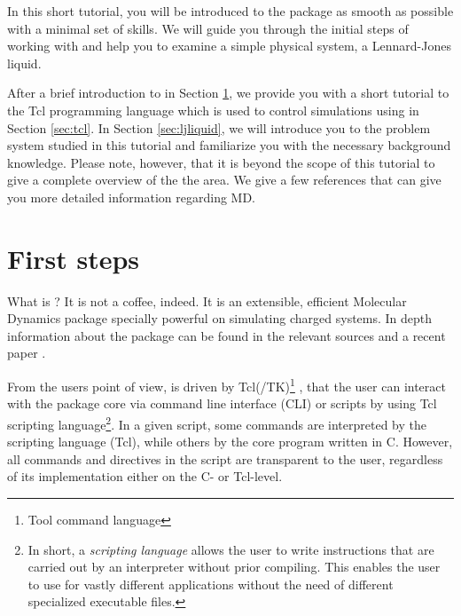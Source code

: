 \documentclass[
paper=a4,                       %
fontsize=11pt,                  %
twoside,                        %
footsepline,                    %
headsepline,                    %
headinclude=false,              %
footinclude=false,              %
pagesize,                       %
]{scrartcl}
\begin{document}
In this short tutorial, you will be introduced to the \es{} package as smooth 
as possible with a minimal set of skills. We will guide you through the initial 
steps of working with \es{} and help you to examine a simple physical system, a 
Lennard-Jones liquid.

After a brief introduction to \es{} in Section \ref{sec:espresso}, we provide 
you with a short tutorial to the Tcl programming language which is used to 
control simulations using \es{} in Section \ref{sec:tcl}. In Section \ref{sec:ljliquid}, we will 
introduce you to the problem system studied in this tutorial and familiarize you with the necessary 
background knowledge. Please note, however, that it is beyond the scope of this 
tutorial to give a complete overview of the the area. We give a few 
references that can give you more detailed information regarding MD.



\section{First steps}\label{sec:espresso}

  What is \es{}? It is not a coffee, indeed. It is an extensible, efficient 
  Molecular Dynamics package specially powerful on simulating charged systems. 
  In depth information about the package can be found in the relevant sources 
  \cite{esp_url,arnold2003ees} and a recent paper \cite{limbach2006ees}.

  From the users point of view, \es{} is driven by Tcl(/TK)\footnote{Tool
  command language} \cite{tcl_url}, that the
  user can interact with the package core via command line interface (CLI) or 
  scripts by using Tcl scripting language\footnote{In short, a \emph{scripting language
  } allows the user to write instructions that are carried out by an interpreter
  without prior compiling. This enables the user to use \es{} for vastly
  different applications without the need of different specialized executable files.}.
  In a given \es{} script, some commands
  are interpreted by the scripting language (Tcl), while others by the core
  \es{} program written in C. However, all \es{} commands and directives in the
  script are
  transparent to the user, regardless of its implementation either on the C- or Tcl-level.
\end{document}
